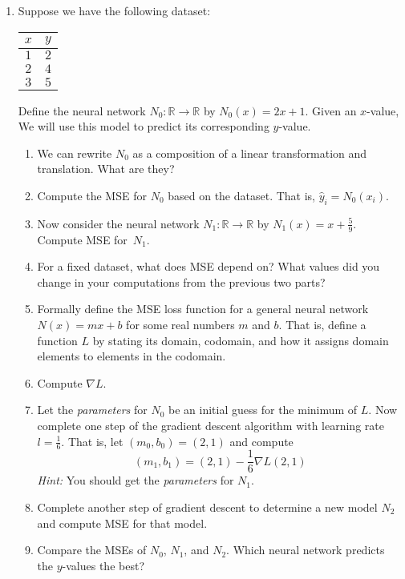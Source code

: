 \documentclass[12pt]{amsart}
\newcommand{\R}{\mathbb{R}}
\theoremstyle{definition}
\begin{document}
\begin{enumerate}[itemsep=2.5em,leftmargin=0pt]
\item Suppose we have the following dataset: \\
\begin{center}
    \begin{tabular}{c|c}
        $x$ & $y$  \\
        \hline
        $1$ & $2$ \\
        $2$ & $4$ \\
        $3$ & $5$
    \end{tabular}
\end{center}
Define the neural network $N_0:\R\to\R$ by $N_0(x)=2x+1$. Given an $x$-value, We will use this model to predict its corresponding $y$-value.
\begin{enumerate}[label=(\alph*),itemsep=.5em]
    \item We can rewrite $N_0$ as a composition of a linear transformation and translation. What are they?
    \item Compute the MSE for $N_0$ based on the dataset. That is, $\hat{y}_i = N_0(x_i)$.
    \item Now consider the neural network $N_1:\R\to\R$ by $N_1(x)=x+\frac{5}{9}$. Compute MSE for~$N_1$.
    \item For a fixed dataset, what does MSE depend on? What values did you change in your computations from the previous two parts?
    \item Formally define the MSE loss function for a general neural network $N(x)=mx+b$ for some real numbers $m$ and $b$. That is, define a function $L$ by stating its domain, codomain, and how it assigns domain elements to elements in the codomain.
    \item Compute $\nabla L$.
    \item Let the \textit{parameters} for $N_0$ be an initial guess for the minimum of $L$. Now complete one step of the gradient descent algorithm with learning rate $l=\frac{1}{6}$. That is, let $(m_0,b_0)=(2,1)$ and compute
    \[
        (m_1, b_1) = ( 2, 1 ) - \frac{1}{6} \nabla L(2,1)
    \]
    \textit{Hint:} You should get the \textit{parameters} for $N_1$.
    \item Complete another step of gradient descent to determine a new model $N_2$ and compute MSE for that model.
    \item Compare the MSEs of $N_0$, $N_1$, and $N_2$. Which neural network predicts the $y$-values the best?
\end{enumerate}

\vspace{2.5em}


\end{enumerate}
\end{document}
